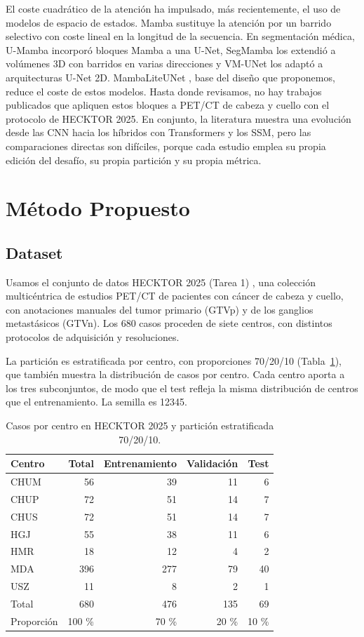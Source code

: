 \documentclass[conference]{IEEEtran}
\begin{document}
El coste cuadrático de la atención ha impulsado, más recientemente, el uso de modelos de espacio de estados. Mamba \cite{gu2023mamba} sustituye la atención por un barrido selectivo con coste lineal en la longitud de la secuencia. En segmentación médica, U-Mamba \cite{ma2024umamba} incorporó bloques Mamba a una U-Net, SegMamba \cite{xing2024segmamba} los extendió a volúmenes 3D con barridos en varias direcciones y VM-UNet \cite{ruan2024vmunet} los adaptó a arquitecturas U-Net 2D. MambaLiteUNet \cite{rahman2026mambalite}, base del diseño que proponemos, reduce el coste de estos modelos. Hasta donde revisamos, no hay trabajos publicados que apliquen estos bloques a PET/CT de cabeza y cuello con el protocolo de HECKTOR 2025. En conjunto, la literatura muestra una evolución desde las CNN hacia los híbridos con Transformers y los SSM, pero las comparaciones directas son difíciles, porque cada estudio emplea su propia edición del desafío, su propia partición y su propia métrica.

\section{Método Propuesto}
\label{sec:arquitectura}
\subsection{Dataset}

Usamos el conjunto de datos HECKTOR 2025 (Tarea 1) \cite{saeed2026hecktor25,saeed2025dataset}, una colección multicéntrica de estudios PET/CT de pacientes con cáncer de cabeza y cuello, con anotaciones manuales del tumor primario (GTVp) y de los ganglios metastásicos (GTVn). Los 680 casos proceden de siete centros, con distintos protocolos de adquisición y resoluciones.

La partición es estratificada por centro, con proporciones 70/20/10 (Tabla~\ref{tab:split}), que también muestra la distribución de casos por centro. Cada centro aporta a los tres subconjuntos, de modo que el test refleja la misma distribución de centros que el entrenamiento. La semilla es 12345.

\begin{table}[!t]
\centering
\caption{Casos por centro en HECKTOR 2025 y partición estratificada 70/20/10.}
\label{tab:split}
\footnotesize
\begin{tabular}{l r r r r}
\hline
Centro & Total & Entrenamiento & Validación & Test \\
\hline
CHUM & 56 & 39 & 11 & 6 \\
CHUP & 72 & 51 & 14 & 7 \\
CHUS & 72 & 51 & 14 & 7 \\
HGJ & 55 & 38 & 11 & 6 \\
HMR & 18 & 12 & 4 & 2 \\
MDA & 396 & 277 & 79 & 40 \\
USZ & 11 & 8 & 2 & 1 \\
\hline
Total & 680 & 476 & 135 & 69 \\
Proporción & 100 \% & 70 \% & 20 \% & 10 \% \\
\hline
\end{tabular}
\end{table}
\end{document}
